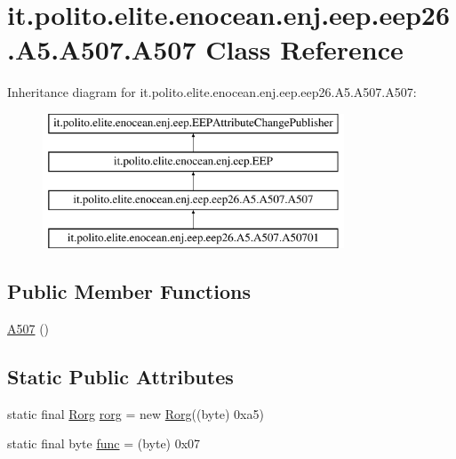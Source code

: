 \hypertarget{classit_1_1polito_1_1elite_1_1enocean_1_1enj_1_1eep_1_1eep26_1_1_a5_1_1_a507_1_1_a507}{}\section{it.\+polito.\+elite.\+enocean.\+enj.\+eep.\+eep26.\+A5.\+A507.\+A507 Class Reference}
\label{classit_1_1polito_1_1elite_1_1enocean_1_1enj_1_1eep_1_1eep26_1_1_a5_1_1_a507_1_1_a507}
Inheritance diagram for it.\+polito.\+elite.\+enocean.\+enj.\+eep.\+eep26.\+A5.\+A507.\+A507\+:\begin{figure}[H]
\begin{center}
\leavevmode
\includegraphics[height=4.000000cm]{classit_1_1polito_1_1elite_1_1enocean_1_1enj_1_1eep_1_1eep26_1_1_a5_1_1_a507_1_1_a507}
\end{center}
\end{figure}
\subsection*{Public Member Functions}
\begin{DoxyCompactItemize}
\item 
\hyperlink{classit_1_1polito_1_1elite_1_1enocean_1_1enj_1_1eep_1_1eep26_1_1_a5_1_1_a507_1_1_a507_aa2b2dd9ef0ba108883d87e950f6f70e8}{A507} ()
\end{DoxyCompactItemize}
\subsection*{Static Public Attributes}
\begin{DoxyCompactItemize}
\item 
static final \hyperlink{classit_1_1polito_1_1elite_1_1enocean_1_1enj_1_1eep_1_1_rorg}{Rorg} \hyperlink{classit_1_1polito_1_1elite_1_1enocean_1_1enj_1_1eep_1_1eep26_1_1_a5_1_1_a507_1_1_a507_a3aa5eb97264c67f46176f7462ef591c0}{rorg} = new \hyperlink{classit_1_1polito_1_1elite_1_1enocean_1_1enj_1_1eep_1_1_rorg}{Rorg}((byte) 0xa5)
\item 
static final byte \hyperlink{classit_1_1polito_1_1elite_1_1enocean_1_1enj_1_1eep_1_1eep26_1_1_a5_1_1_a507_1_1_a507_a2ce5037e955bdc5cf02e51052dd0558d}{func} = (byte) 0x07
\end{DoxyCompactItemize}
